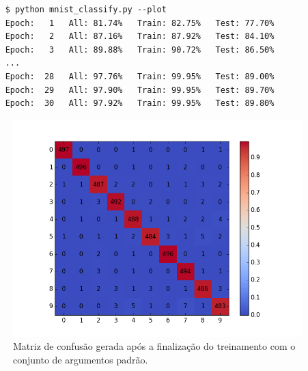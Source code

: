 \documentclass{article}
\begin{document}
\begin{verbatim}
    $ python mnist_classify.py --plot
    Epoch:   1   All: 81.74%   Train: 82.75%   Test: 77.70%
    Epoch:   2   All: 87.16%   Train: 87.92%   Test: 84.10%
    Epoch:   3   All: 89.88%   Train: 90.72%   Test: 86.50%
    ...
    Epoch:  28   All: 97.76%   Train: 99.95%   Test: 89.00%
    Epoch:  29   All: 97.90%   Train: 99.95%   Test: 89.70%
    Epoch:  30   All: 97.92%   Train: 99.95%   Test: 89.80%
\end{verbatim}

\begin{figure}[htbp]
    \centering
    \includegraphics[scale=0.65]{confusion_matrix}
    \caption{Matriz de confusão gerada após a finalização do treinamento
        com o conjunto de argumentos padrão.}
    \label{fig01}
\end{figure}
\end{document}
